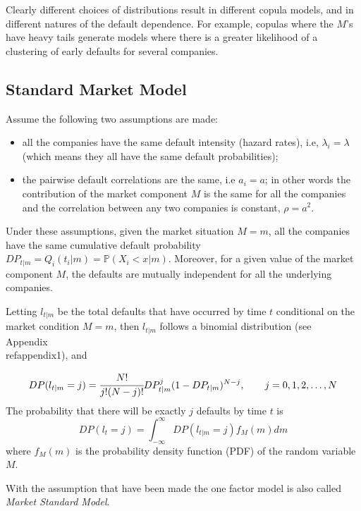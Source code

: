 Clearly different choices of distributions result in different copula models, and in different natures of the default dependence. For example, copulas where the \(M\)'s have heavy tails generate models where there is a
greater likelihood of a clustering of early defaults for several
companies.

\subsection{Standard Market Model}\label{standard-market-model}

Assume the following two assumptions are made:

\begin{itemize}
	\tightlist
	\item
	all the companies have the same default intensity (hazard rates), i.e, \(\lambda_i = \lambda\) (which means they all have the same default probabilities);
	\item
	the pairwise default correlations are the same, i.e \(a_i = a\); in other words the contribution of the market
	component $M$ is the same for all the companies and the correlation between any two companies is constant, \(\rho = a^2\).
\end{itemize}

Under these assumptions, given the market situation \(M = m\), all the
companies have the same cumulative default probability
\(DP_{t|m}=Q_i(t_i|m)=\mathbb{P}(X_i < x|m)\). 
Moreover, for a given value of the
market component \(M\), the defaults are mutually independent for all
the underlying companies. 

Letting \(l_{t|m}\) be the total defaults that
have occurred by time \(t\) conditional on the market condition
\(M = m\), then \(l_{t|m}\) follows a binomial distribution (see Appendix~\\ref{appendix1}), and

\[DP(l_{t|m} = j) = \cfrac{N!}{j!(N-j)!}DP^j_{t|m}(1-DP_{t|m})^{N-j},\qquad  j=0, 1, 2,\ldots,N\]
The probability that there will be exactly \(j\) defaults by time \(t\)
is
\begin{equation}
DP(l_{t} = j) = \int_{-\infty}^{\infty}{DP(l_{t|m} = j)f_M(m)dm}
\label{eq:gaussian_quadrature}
\end{equation}
where \(f_M(m)\) is the probability density function (PDF) of the random
variable \(M\).

With the assumption that have been made the one factor model is also called \emph{Market Standard Model}.


